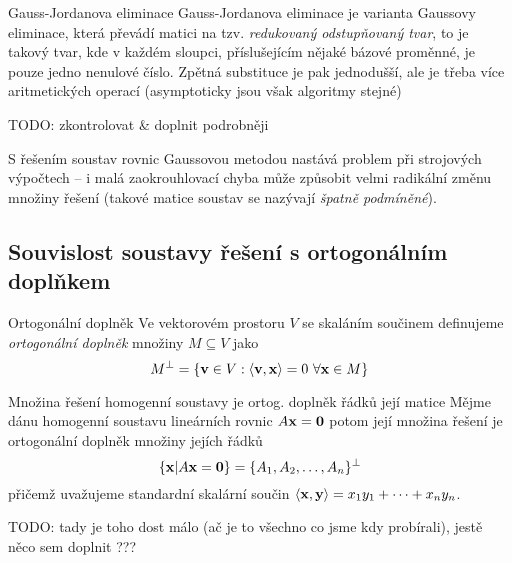 \begin{algoritmusN}{Gauss-Jordanova eliminace}
Gauss-Jordanova eliminace je varianta Gaussovy eliminace, která převádí matici na tzv. \emph{redukovaný odstupňovaný tvar}, to je takový tvar, kde v každém sloupci, příslušejícím nějaké bázové proměnné, je pouze jedno nenulové číslo. Zpětná substituce je pak jednodušší, ale je třeba více aritmetických operací (asymptoticky jsou však algoritmy stejné)

TODO: zkontrolovat \& doplnit podrobněji
\end{algoritmusN}

\begin{poznamka}
S řešením soustav rovnic Gaussovou metodou nastává problem při strojových výpočtech -- i malá zaokrouhlovací chyba může způsobit velmi radikální změnu množiny řešení (takové matice soustav se nazývají \emph{špatně podmíněné}).
\end{poznamka}

\subsection{Souvislost soustavy řešení s ortogonálním doplňkem}

\begin{definiceN}{Ortogonální doplněk}
Ve vektorovém prostoru $V$ se skaláním součinem definujeme \emph{ortogonální doplněk} množiny $M\subseteq V$ jako $$M^{\bot}=\{\mathbf{v}\in V:\left<\mathbf{v},\mathbf{x}\right>=0\ \forall\mathbf{x}\in M\}$$
\end{definiceN}

\begin{vetaN}{Množina řešení homogenní soustavy je ortog. doplněk řádků její matice}
Mějme dánu homogenní soustavu lineárních rovnic $A\mathbf{x}=\mathbf{0}$ potom její množina řešení je ortogonální doplněk množiny jejích řádků 
$$\{\mathbf{x}|A\mathbf{x}=\mathbf{0}\}=\{A_1,A_2,\dots,A_n\}^{\bot}$$
přičemž uvažujeme standardní skalární součin $\left<\mathbf{x},\mathbf{y}\right>=x_1y_1+\dots+x_ny_n$.
\end{vetaN}

TODO: tady je toho dost málo (ač je to všechno co jsme kdy probírali), jestě něco sem doplnit ???
